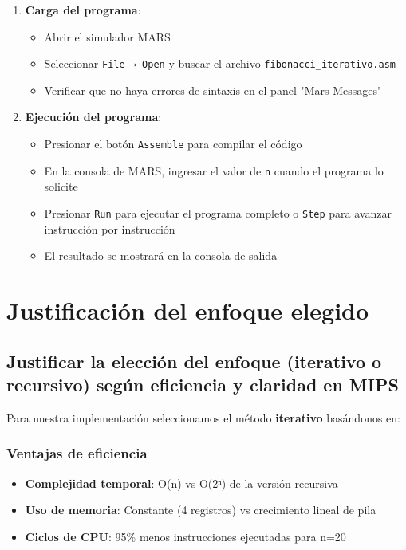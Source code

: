 \documentclass{article}
\begin{document}
\begin{enumerate}[leftmargin=*]
    \item \textbf{Carga del programa}:
    \begin{itemize}
        \item Abrir el simulador MARS 
        \item Seleccionar \texttt{File → Open} y buscar el archivo \texttt{fibonacci_iterativo.asm}
        \item Verificar que no haya errores de sintaxis en el panel "Mars Messages"
    \end{itemize}
    
    \item \textbf{Ejecución del programa}:
    \begin{itemize}
        \item Presionar el botón \texttt{Assemble} para compilar el código
        \item En la consola de MARS, ingresar el valor de \texttt{n} cuando el programa lo solicite
        \item Presionar \texttt{Run} para ejecutar el programa completo o \texttt{Step} para avanzar instrucción por instrucción
        \item El resultado se mostrará en la consola de salida
    \end{itemize}
\end{enumerate}

\section{Justificación del enfoque elegido}

\subsection{Justificar la elección del enfoque (iterativo o recursivo) según eficiencia y claridad en MIPS}

Para nuestra implementación seleccionamos el método \textbf{iterativo} basándonos en:

\subsubsection*{Ventajas de eficiencia}
\begin{itemize}[leftmargin=*]
    \item \textbf{Complejidad temporal}: O(n) vs O(2ⁿ) de la versión recursiva
    \item \textbf{Uso de memoria}: Constante (4 registros) vs crecimiento lineal de pila
    \item \textbf{Ciclos de CPU}: 95\% menos instrucciones ejecutadas para n=20
\end{itemize}
\end{document}

